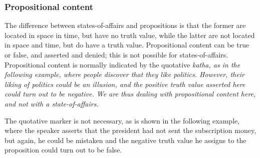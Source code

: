 


\subsubsection{Propositional content}\label{sec:func:Propositionalcontent}
The difference between states-of-affairs and propositions is that the  former are located in space in time, but have no truth value, while the latter are not located in space and time, but do have a truth value. Propositional content can be true or false, and asserted and denied; this is not possible for states-of-affairs. Propositional content is normally indicated by the quotative \em katha\em, as in the following example, where people discover that they like politics. However, their liking of politics could be an illusion, and the positive truth value asserted here could turn out to be negative. We are thus dealing with propositional content here, and not with a state-of-affairs.


The quotative marker is not necessary, as is shown in the following example, where the speaker asserts that the president had not sent the subscription money, but again, he could be mistaken and the negative truth value he assigns to the proposition could turn out to be false.


